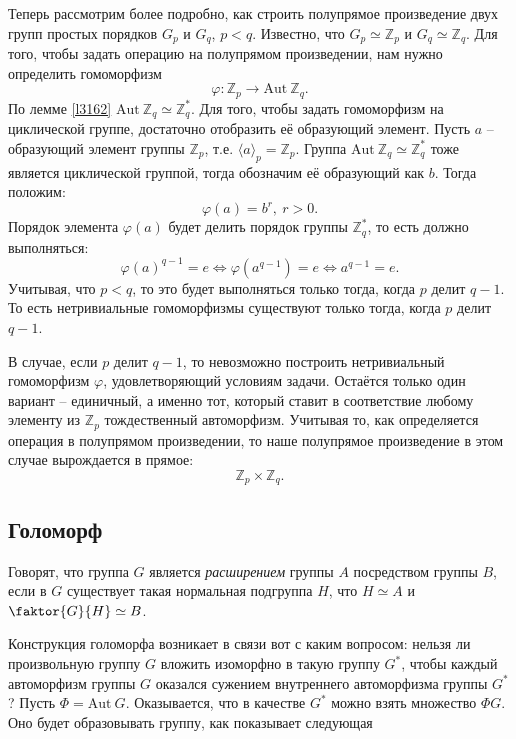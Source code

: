 \documentclass{article}
\begin{document}
Теперь рассмотрим более подробно, как строить полупрямое произведение двух групп простых порядков $G_p$ и $G_q$, $p < q$. Известно, что $G_p \simeq \mathbb{Z}_p$ и $G_q \simeq \mathbb{Z}_q$. Для того, чтобы задать операцию на полупрямом произведении, нам нужно определить гомоморфизм $$ \varphi: \mathbb{Z}_p \rightarrow \mathrm{Aut} \ \mathbb{Z}_q. $$
По лемме \ref{l3162} $\mathrm{Aut} \ \mathbb{Z}_q \simeq \mathbb{Z}_q^*$. Для того, чтобы задать гомоморфизм на циклической группе, достаточно отобразить её образующий элемент. Пусть $a$ -- образующий элемент группы $\mathbb{Z}_p$, т.е. $\langle a \rangle_p = \mathbb{Z}_p$. Группа $\mathrm{Aut} \ \mathbb{Z}_q \simeq \mathbb{Z}_q^*$ тоже является циклической группой, тогда обозначим её образующий как $b$. Тогда положим:
\[
    \varphi(a) = b^r, \ r > 0.
\]
Порядок элемента $\varphi(a)$ будет делить порядок группы $\mathbb{Z}_q^*$, то есть должно выполняться:
\[
    \varphi(a)^{q - 1} = e \Leftrightarrow \varphi(a^{q-1}) = e \Leftrightarrow a^{q-1} = e.
\]
Учитывая, что $p < q$, то это будет выполняться только тогда, когда $p$ делит $q - 1$. То есть нетривиальные гомоморфизмы существуют только тогда, когда $p$ делит $q - 1$.

В случае, если $p$ делит $q - 1$, то невозможно построить нетривиальный гомоморфизм $\varphi$, удовлетворяющий условиям задачи. Остаётся только один вариант -- единичный, а именно тот, который ставит в соответствие любому элементу из $\mathbb{Z}_p$ тождественный автоморфизм. Учитывая то, как определяется операция в полупрямом произведении, то наше полупрямое произведение в этом случае вырождается в прямое:
\[
    \mathbb{Z}_p \times \mathbb{Z}_q.
\]

\subsection{Голоморф}

Говорят, что группа $G$ является \textit{расширением} группы $A$ посредством группы $B$, если в $G$ существует такая нормальная подгруппа $H$, что $H \simeq A$ и $\faktor{G}{H} \simeq B$.

Конструкция голоморфа возникает в связи вот с каким вопросом: нельзя ли произвольную группу $G$ вложить изоморфно в такую группу $G^*$, чтобы каждый автоморфизм группы $G$ оказался сужением внутреннего автоморфизма группы $G^*$?
Пусть $\Phi = \mathrm{Aut} \ G$. Оказывается, что в качестве $G^*$ можно взять множество $\Phi G$. Оно будет образовывать группу, как показывает следующая
\end{document}
